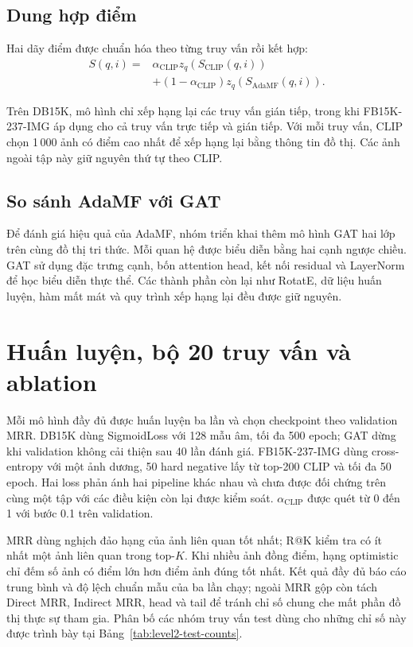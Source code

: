 \subsection{Dung hợp điểm}

Hai dãy điểm được chuẩn hóa theo từng truy vấn rồi kết hợp:
\begin{equation}
\begin{aligned}
S(q,i)={}&\alpha_{\mathrm{CLIP}}z_q(S_{\mathrm{CLIP}}(q,i))\\
&+(1-\alpha_{\mathrm{CLIP}})z_q(S_{\mathrm{AdaMF}}(q,i)).
\end{aligned}
\label{eq:mmkg-rerank}
\end{equation}

Trên DB15K, mô hình chỉ xếp hạng lại các truy vấn
gián tiếp, trong khi FB15K-237-IMG áp dụng cho
cả truy vấn trực tiếp và gián tiếp. Với mỗi truy
vấn, CLIP chọn 1\,000 ảnh có điểm cao nhất để
xếp hạng lại bằng thông tin đồ thị. Các ảnh
ngoài tập này giữ nguyên thứ tự theo CLIP.

\subsection{So sánh AdaMF với GAT}
\label{sec:level2-gat}

Để đánh giá hiệu quả của AdaMF, nhóm triển khai
thêm mô hình GAT hai lớp trên cùng đồ thị tri thức.
Mỗi quan hệ được biểu diễn bằng hai cạnh ngược chiều.
GAT sử dụng đặc trưng cạnh, bốn attention head,
kết nối residual và LayerNorm để học biểu diễn thực thể.
Các thành phần còn lại như RotatE, dữ liệu huấn luyện,
hàm mất mát và quy trình xếp hạng lại đều được giữ nguyên.

\section{Huấn luyện, bộ 20 truy vấn và ablation}
\label{sec:level2-protocol}
\label{sec:baselines-ablations}

Mỗi mô hình đầy đủ được huấn luyện ba lần và chọn checkpoint theo validation MRR. DB15K dùng SigmoidLoss với 128 mẫu âm, tối đa 500 epoch; GAT dừng khi validation không cải thiện sau 40 lần đánh giá. FB15K-237-IMG dùng cross-entropy với một ảnh dương, 50 hard negative lấy từ top-200 CLIP và tối đa 50 epoch. Hai loss phản ánh hai pipeline khác nhau và chưa được đối chứng trên cùng một tập với các điều kiện còn lại được kiểm soát. $\alpha_{\mathrm{CLIP}}$ được quét từ 0 đến 1 với bước 0.1 trên validation.

MRR dùng nghịch đảo hạng của ảnh liên quan tốt nhất; R@K kiểm tra có ít nhất một ảnh liên quan trong top-$K$. Khi nhiều ảnh đồng điểm, hạng optimistic chỉ đếm số ảnh có điểm lớn hơn điểm ảnh đúng tốt nhất. Kết quả đầy đủ báo cáo trung bình và độ lệch chuẩn mẫu của ba lần chạy; ngoài MRR gộp còn tách Direct MRR, Indirect MRR, head và tail để tránh chỉ số chung che mất phần đồ thị thực sự tham gia. Phân bố các nhóm truy vấn test dùng cho những chỉ số này được trình bày tại Bảng~\ref{tab:level2-test-counts}.

